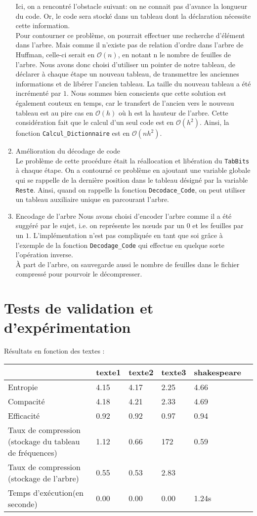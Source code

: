 \documentclass[a4paper,11pt]{article}
\begin{document}
\begin{enumerate}
			Ici, on a rencontré l'obstacle suivant: on ne connait pas d'avance la longueur du code. Or, le code sera stocké dans un tableau dont la déclaration nécessite cette information.\\
			Pour contourner ce problème, on pourrait effectuer une recherche d'élément dans l'arbre. Mais comme il n'existe pas de relation d'ordre dans l'arbre de Huffman, celle-ci serait en $\mathcal{O}(n)$, en notant n le nombre de feuilles de l'arbre.
			Nous avons donc choisi d'utiliser un pointer de notre tableau, de déclarer à chaque étape un nouveau tableau, de transmettre les anciennes informations et de libérer l'ancien tableau. La taille du nouveau tableau a été incrémenté par $1$. 
			Nous sommes bien conscients que cette solution est également couteux en temps, car le transfert de l'ancien vers le nouveau tableau est au pire cas en $\mathcal{O}(h)$ où h est la hauteur de l'arbre. Cette considération fait que le calcul d'un seul code est en $\mathcal{O}(h^2)$. 
			Ainsi, la fonction \verb+Calcul_Dictionnaire+ est en $\mathcal{O}(nh^2)$.
		\item{Amélioration du décodage de code}\\
			Le problème de cette procédure était la réallocation et libération du \verb+TabBits+ à chaque étape. On a contourné ce problème en ajoutant une variable globale qui se rappelle de la dernière position dans le tableau désigné par la variable \verb+Reste+. Ainsi, quand on rappelle la fonction \verb+Decodace_Code+, on peut utiliser un tableau auxiliaire unique en parcourant l'arbre.
		\item{Encodage de l'arbre}
			Nous avons choisi d'encoder l'arbre comme il a été suggéré par le sujet, i.e. on représente les n\oe{}uds par un $0$ et les feuilles par un $1$. L'implémentation n'est pas compliquée en tant que soi grâce à l'exemple de la fonction \verb+Decodage_Code+ qui effectue en quelque sorte l'opération inverse.\\
			À part de l'arbre, on sauvegarde aussi le nombre de feuilles dans le fichier compressé pour pourvoir le décompresser.
	\end{enumerate}

\section{Tests de validation et d'expérimentation} 

\large Résultats en fonction des textes : \\
\begin{tabular}{|l|l|l|l|l|l}
\hline
 & texte1 & texte2 & texte3 & shakespeare \\
\hline
Entropie & 4.15 & 4.17 & 2.25 & 4.66 \\
Compacité & 4.18 & 4.21 & 2.33 & 4.69 \\
Efficacité & 0.92 & 0.92 & 0.97 & 0.94 \\
Taux de compression (stockage du tableau de fréquences) & 1.12 & 0.66 & 172 & 0.59 \\
Taux de compression (stockage de l'arbre) & 0.55  & 0.53  & 2.83  &   & \\
Temps d'exécution(en seconde) & 0.00 & 0.00 & 0.00 & 1.24s \\
\hline
\end{tabular}
\end{document}
